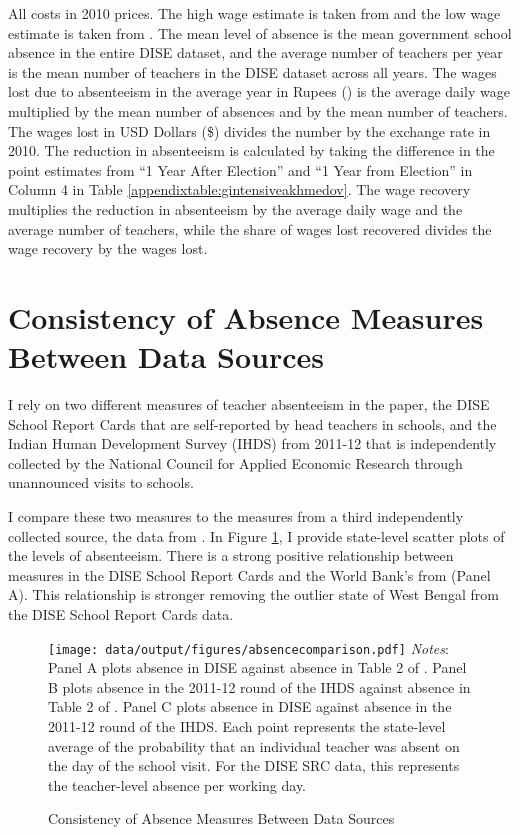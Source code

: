 \documentclass[hidelinks, 12pt, article, oneside]{memoir}
\begin{document}
All costs in 2010 prices.  The high wage estimate is taken from \cite{Muralidharan2016} and the low wage estimate is taken from \cite{Kingdon2010}. The mean level of absence is the mean government school absence in the entire DISE dataset, and the average number of teachers per year is the mean number of teachers in the DISE dataset across all years.  The wages lost due to absenteeism in the average year in Rupees (\rupee) is the average daily wage multiplied by the mean number of absences and by the mean number of teachers.  The wages lost in USD Dollars (\$) divides the number by the exchange rate in 2010.  The reduction in absenteeism is calculated by taking the difference in the point estimates from ``1 Year After Election'' and ``1 Year from Election'' in Column 4 in Table \ref{appendixtable:gintensiveakhmedov}.  The wage recovery multiplies the reduction in absenteeism by the average daily wage and the average number of teachers, while the share of wages lost recovered divides the wage recovery by the wages lost.

\clearpage

\section{Consistency of Absence Measures Between Data Sources}

I rely on two different measures of teacher absenteeism in the paper, the DISE School Report Cards that are self-reported by head teachers in schools, and the Indian Human Development Survey (IHDS) from 2011-12 that is independently collected by the National Council for Applied Economic Research through unannounced visits to schools.

I compare these two measures to the measures from a third independently collected source, the data from \cite{Kremer2005}.  In Figure \ref{appendixfigure:absencecomparison}, I provide state-level scatter plots of the levels of absenteeism.  There is a strong positive relationship between measures in the DISE School Report Cards and the World Bank's from \cite{Kremer2005} (Panel A).  This relationship is stronger removing the outlier state of West Bengal from the DISE School Report Cards data.

\begin{figure}[htbp]
\caption{Consistency of Absence Measures Between Data Sources\label{appendixfigure:absencecomparison}}
\centering
\begin{minipage}{6.5in}
    \texttt{[image: data/output/figures/absencecomparison.pdf]}
    \tiny \emph{Notes}: Panel A plots absence in DISE against absence in Table 2 of \cite{Kremer2005}.  Panel B plots absence in the 2011-12 round of the IHDS against absence in Table 2 of \cite{Kremer2005}.  Panel C plots absence in DISE against absence in the 2011-12 round of the IHDS. Each point represents the state-level average of the probability that an individual teacher was absent on the day of the school visit.  For the DISE SRC data, this represents the teacher-level absence per working day. 
\end{minipage}
\end{figure}
\end{document}
